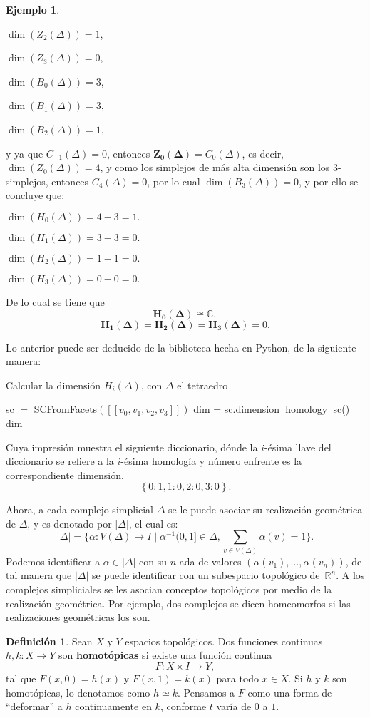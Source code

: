 \documentclass[12pt]{book}
\theoremstyle{definition}
\newtheorem{definition}[theorem]{Definición}
\newtheorem{example}[theorem]{Ejemplo}
\newcounter{in}
\newcounter{ini}
\begin{document}
\begin{example}
\begin{center}
  $\dim(Z_{2}(\Delta)) = 1$,

  $\dim(Z_{3}(\Delta)) = 0$,

  $\dim(B_{0}(\Delta)) = 3$,

  $\dim(B_{1}(\Delta)) = 3$,

  $\dim(B_{2}(\Delta)) = 1$,
\end{center}
y ya que $C_{-1}(\Delta)=0$, entonces
$\boldsymbol{Z_{0}(\Delta)}=C_{0}(\Delta)$, es decir,
$\dim(Z_{0}(\Delta))=4$, y como los simplejos de más alta dimensión
son los $3$-simplejos, entonces $C_4(\Delta) = 0$, por lo cual
$\dim(B_{3}(\Delta))=0$, y por ello se concluye que:
\begin{center}
 $\dim(H_{0}(\Delta))=4-3=1.$

 $\dim(H_{1}(\Delta))=3-3=0.$

 $\dim(H_{2}(\Delta))=1-1=0.$

 $\dim(H_{3}(\Delta))=0-0=0.$
\end{center}
De lo cual se tiene que
$$\boldsymbol{H_{0}(\Delta)} \cong \mathbb{C},$$
$$\boldsymbol{H_{1}(\Delta)}=\boldsymbol{H_{2}(\Delta)}=\boldsymbol{H_{3}(\Delta)}=0.$$
\end{example}
Lo anterior puede ser deducido de la biblioteca hecha en Python, de la
siguiente manera:
\begin{algorithm}[H]
\caption{Calcular la dimensión $H_{i}(\Delta)$, con $\Delta$ el tetraedro}
\begin{algorithmic}
\STATE sc $=$ SCFromFacets$(\left [ \left [ v_0,v_1,v_2,v_3 \right ] \right ])$
\STATE dim = sc.dimension$_{-}$homology$_{-}$sc()
\PRINT dim
\end{algorithmic}
\end{algorithm}
Cuya impresión muestra el siguiente diccionario, dónde la $i$-ésima
llave del diccionario se refiere a la $i$-ésima homología y número
enfrente es la correspondiente dimensión.
$$ \left \{0: 1, 1: 0, 2: 0, 3: 0  \right \}.$$

Ahora, a cada complejo simplicial $\Delta$ se le puede asociar su
realización geométrica de $\Delta$, y es denotado por $|\Delta|$, el
cual es:
\begin{equation}
  \label{eq:112}
|\Delta|=\{\alpha:V(\Delta)\rightarrow I\mid\alpha^{-1}(0,1]\in
\Delta, \sum _{v\in V(\Delta)}\alpha(v)=1\}.
\end{equation}
Podemos identificar a $\alpha\in |\Delta|$ con su $n$-ada de valores
$(\alpha(v_{1}),\dots,\alpha(v_{n}))$, de tal manera que $|\Delta|$ se
puede identificar con un subespacio topológico de~$\mathbb{R}^{n}$.
A los complejos simpliciales se les asocian conceptos topológicos por
medio de la realización geométrica. Por ejemplo, dos complejos se
dicen homeomorfos si las realizaciones geométricas los son.
\begin{definition}
  Sean $X$ y $Y$ espacios topológicos. Dos funciones continuas
  $h,k:X\rightarrow Y$ son \textbf{homotópicas} si existe una función continua
  $$F:X\times I\rightarrow Y,$$
  tal que $F(x,0)=h(x)$ y $F(x,1)=k(x)$ para todo $x\in X.$ Si $h$ y
  $k$ son homotópicas, lo denotamos como $h\simeq k$. Pensamos a $F$
  como una forma de ``deformar'' a $h$ continuamente en $k$, conforme
  $t$ varía de $0$ a $1$.
\end{definition}
\end{document}
